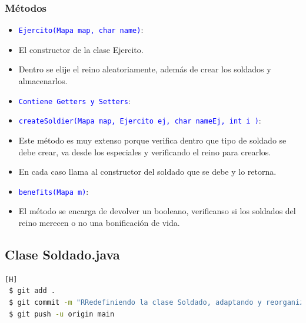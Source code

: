 \documentclass{article}
\begin{document}
\subsubsection{Métodos}
\begin{itemize}
    \item \texttt{\textcolor{blue}{Ejercito(Mapa map, char name)}}: 
    \item El constructor de la clase Ejercito.
    \item Dentro se elije el reino aleatoriamente, además de crear los soldados y almacenarlos.
\end{itemize}

\begin{itemize}
    \item \texttt{\textcolor{blue}{Contiene Getters y Setters}}: 
\end{itemize}
\begin{itemize}
    \item \texttt{\textcolor{blue}{createSoldier(Mapa map, Ejercito ej, char nameEj, int i )}}: 
    \item Este método es muy extenso porque verifica dentro que tipo de soldado se debe crear, va desde los especiales y verificando el reino para crearlos.
    \item En cada caso llama al constructor del soldado que se debe y lo retorna.
\end{itemize}

\begin{itemize}
    \item \texttt{\textcolor{blue}{benefits(Mapa m)}}: 
    \item El método se encarga de devolver un booleano, verificanso si los soldados del reino merecen o no una bonificación de vida.
\end{itemize}



\newpage
\subsection{Clase Soldado.java}
\begin{lstlisting}[language=bash,caption={Commit \href{https://github.com/hernanchoquehuanca/fp2-23b/commit/87c06664db8bbb53d690bab28f87f8b52046ba41}{87c0666}: Redefiniendo la clase Soldado, adaptando y reorganizando su contenido}][H]
 $ git add .
 $ git commit -m "RRedefiniendo la clase Soldado, adaptando y reorganizando su contenido"			
 $ git push -u origin main
\end{lstlisting}
\end{document}
